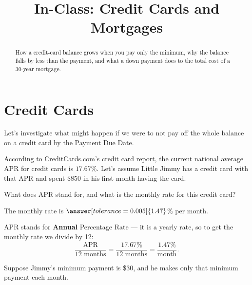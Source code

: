 \documentclass[12pt]{ximera}
\title{In-Class: Credit Cards and Mortgages}
\begin{document}
\begin{abstract}
How a credit-card balance grows when you pay only the minimum, why the balance falls
by less than the payment, and what a down payment does to the total cost of a
30-year mortgage.
\end{abstract}
\maketitle

\section*{Credit Cards}

Let's investigate what might happen if we were to not pay off the whole balance on a
credit card by the Payment Due Date.

According to \href{http://CreditCards.com}{CreditCards.com}'s credit card report, the
current national average APR for credit cards is $17.67\%$. Let's assume Little Jimmy
has a credit card with that APR and spent \$850 in his first month having the card.

\begin{problem}
What does APR stand for, and what is the monthly rate for this credit card?

The monthly rate is $\answer[tolerance=0.005]{1.47}$\% per month.

\begin{solution}
APR stands for \textbf{Annual} Percentage Rate --- it is a yearly rate, so to get the
monthly rate we divide by 12:
\[
\frac{\text{APR}}{12 \text{ months}} = \frac{17.67\%}{12 \text{ months}}
= \frac{1.47\%}{\text{month}}.
\]
\end{solution}
\end{problem}

Suppose Jimmy's minimum payment is \$30, and he makes only that minimum payment each
month.
\end{document}
